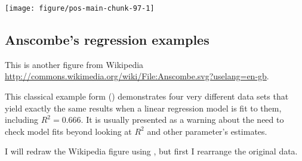 \documentclass[krantz2]{krantz}\usepackage{knitr}%
\begin{document}
\begin{knitrout}
{\centering \texttt{[image: figure/pos-main-chunk-97-1]} 

}



\end{knitrout}

\subsection{Anscombe's regression examples}\label{sec:plot:anscombe}

\begin{knitrout}\footnotesize
{}\color{fgcolor}\begin{kframe}
\begin{alltt}
\hlopt{$}
\end{alltt}
\end{kframe}
\end{knitrout}

This is another figure from Wikipedia \url{http://commons.wikimedia.org/wiki/File:Anscombe.svg?uselang=en-gb}.

This classical example form \citeauthor{Anscombe1973} (\citeyear{Anscombe1973}) demonstrates four very different data sets that yield exactly the same results when a linear regression model is fit to them, including $R^2 = 0.666$. It is usually presented as a warning about the need to check model fits beyond looking at $R^2$ and other parameter's estimates.

I will redraw the Wikipedia figure using \ggplot, but first I rearrange the original data.

\begin{knitrout}\footnotesize
{}\color{fgcolor}\begin{kframe}
\begin{alltt}
 \hlkwb{<-} \hlstd{(}  \hlstd{=} \hlstd{)}
 \hlkwb{<-} \hlstd{(} \hlstd{= my.mat[ ,} \hlstd{],}
                           \hlstd{= my.mat[ ,} \hlstd{],}
                          \hlstd{=}\hlstd{(}\hlstd{(}\hlopt{:}\hlstd{,} \hlstd{(}\hlstd{,}\hlstd{))))}
\end{alltt}
\end{kframe}
\end{knitrout}
\end{document}
